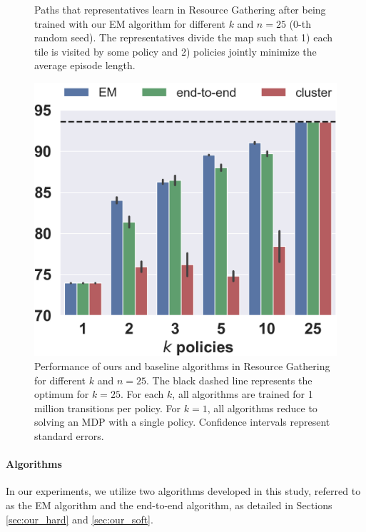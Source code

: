 \documentclass[letterpaper]{article} %
\begin{document}
\begin{figure}[t]
\begin{center}
\caption{Paths that representatives learn in Resource Gathering after being trained with our EM algorithm for different $k$ and $n=25$ ($0$-th random seed). The representatives divide the map such that 1) each tile is visited by some policy and 2) policies jointly minimize the average episode length.}
\label{fig:results_resource}
\end{center}
\end{figure}



\begin{figure}[t]
\begin{center}
    \centering
    \includegraphics[width=0.8\linewidth]{pics/resource-gathering-v1_bars.png}
\caption{Performance of ours and baseline algorithms in Resource Gathering for different $k$ and $n=25$. The black dashed line represents the optimum for $k=25$. For each $k$, all algorithms are trained for 1 million transitions per policy. For $k=1$, all algorithms reduce to solving an MDP with a single policy. Confidence intervals represent standard errors.}
\label{fig:results_resource_sw}
\end{center}
\end{figure}

\paragraph{Algorithms}

In our experiments, we utilize two algorithms developed in this study, referred to as the EM algorithm and the end-to-end algorithm, as detailed in Sections \ref{sec:our_hard} and \ref{sec:our_soft}.
\end{document}

